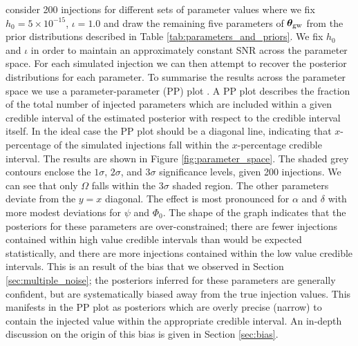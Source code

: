 \documentclass[fleqn,usenatbib,useAMS]{mnras}
\providecommand{\DIFadd}[1]{{\protect\color{blue}\uwave{#1}}} %
\providecommand{\DIFaddend}{} %
\DeclareRobustCommand{\DIFaddend}{\DIFOaddend \let\includegraphics\DIFOincludegraphics} %
\begin{document}
\DIFadd{We }\DIFaddend consider 200 injections for different sets of parameter values where we fix $h_0 = 5 \times 10^{-15}$, $\iota =1.0$ and draw the remaining five parameters of $\boldsymbol{\theta}_{\rm gw}$ from the prior distributions described in Table \ref{tab:parameters_and_priors}. We fix $h_0$ and $\iota$ in order to maintain an approximately constant SNR across the parameter space. For each simulated injection we can then attempt to recover the posterior distributions for each parameter. To summarise the results across the parameter space we use a parameter-parameter (PP) plot \citep{doi:10.1198/106186006X136976}. A PP plot describes the fraction of the total number of injected parameters which are included within a given credible interval of the estimated posterior with respect to the credible interval itself. In the ideal case the PP plot should be a diagonal line, indicating that $x$-percentage of the simulated injections fall within the $x$-percentage credible interval. The results are shown in Figure \ref{fig:parameter_space}. The shaded grey contours enclose the $1\sigma$, $2\sigma$, and $3\sigma$ significance levels, given 200 injections. We can see that only $\Omega$ falls within the $3\sigma$ shaded region. The other parameters deviate from the $y=x$ diagonal. The effect is most pronounced for $\alpha$ and $\delta$ with more modest deviations for $\psi$ and $\Phi_0$. The shape of the graph indicates that the posteriors for these parameters are over-constrained; there are fewer injections contained within high value credible intervals than would be expected statistically, and there are more injections contained within the low value credible intervals. This is an result of the bias that we observed in Section \ref{sec:multiple_noise}; the posteriors inferred for these parameters are generally confident, but are systematically biased away from the true injection values. This manifests in the PP plot as posteriors which are overly precise (narrow) to contain the injected value within the appropriate credible interval. An in-depth discussion on the origin of this bias is given in Section \ref{sec:bias}. 
\end{document}
